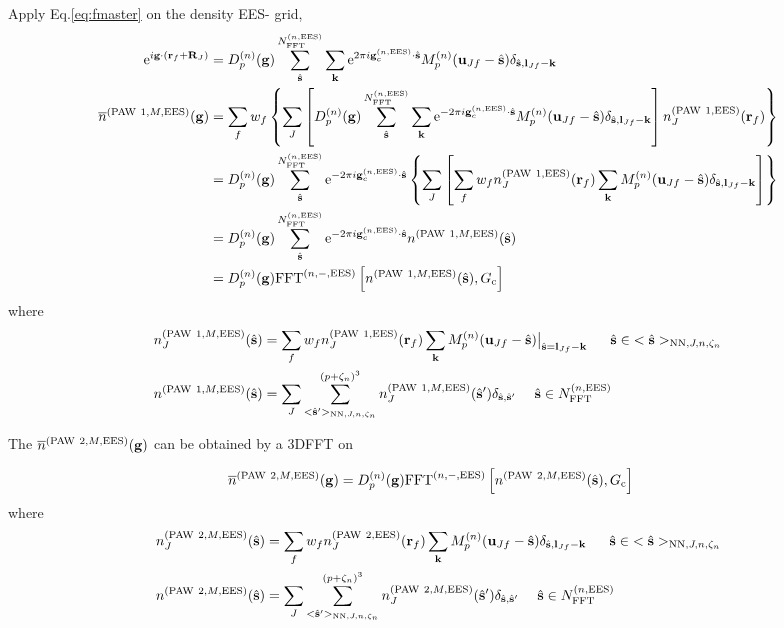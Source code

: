 \documentclass[paper=a4, fontsize=11pt]{article} %
\numberwithin{equation}{section} %
\numberwithin{figure}{section} %
\numberwithin{table}{section} %
\newcommand{\ol}{\overline}
\newcommand{\bu}{{\bf{u}}}
\newcommand{\bl}{{\bf{l}}}
\newcommand{\bk}{{\bf{k}}}
\newcommand{\bs}{{\bf{s}}}
\newcommand{\bg}{{\bf{g}}}
\newcommand{\br}{{\bf{r}}}
\newcommand{\bR}{{\bf{R}}}
\newcommand{\hs}{{\hat{\bf{s}}}}
\newcommand{\rEES}{{\mathrm{EES}}}
\newcommand{\rNN}{{\mathrm{NN}}}
\newcommand{\re}{{\mathrm{e}}}
\newcommand{\rP}{{\mathrm{PAW}}}
\newcommand{\gcnEES}{{\bg_c^{(n,\rEES)}}}
\newcommand{\NFFTnEES}{{N^{(n,\rEES)}_{\mathrm{FFT}}}}
\newcommand{\Gc}{{G_{\mathrm{c}}}}
\newcommand{\Dng}{{D^{(n)}_p(\bg)}}
\newcommand{\FFTniEES}{{\mathrm{FFT}^{(n,-,\rEES)}}}
\newcommand{\pzn}{{(p+\zeta_n)^3}}
\newcommand{\hsJn}{{<\hs>_{\rNN,J,n,\zeta_n}}}
\newcommand{\hsinJn}{{\ \ \ \ \ \hs  \in  \hsJn}}
\newcommand{\hspJn}{{<\hs'>_{\rNN,J,n,\zeta_n}}}
\newcommand{\hsinnEES}{{\ \ \ \ \hs \in \NFFTnEES}}
\begin{document}
Apply Eq.\eqref{eq:fmaster} on the density EES- grid,
\begin{equation} \label{eq:n1gEES}
\begin{split}
\re^{i\bg\cdot(\br_f+\bR_J)}
  & = D_p^{(n)}(\bg)\sum_{\hat \bs}^{\NFFTnEES} \sum_{\bk} \re^{2\pi i\gcnEES \cdot \hat\bs} M_p^{(n)}(\bu_{Jf}-\hat \bs)\delta_{\hat \bs,\bl_{Jf}-\bk} \\
 \ol n^{(\rP\ 1,M,\rEES)}(\bg)
 &=  \sum_f w_f \left\{\sum_J \left[\Dng\sum_{\hat \bs}^{\NFFTnEES} \sum_{\bk} \re^{-2\pi i\gcnEES \cdot \hat\bs} M_p^{(n)}(\bu_{Jf}-\hat \bs)\delta_{\hat \bs,\bl_{Jf}-\bk}\right] n_J^{(\rP\ 1,\rEES)}(\br_f) \right\} \\
 &= D_p^{(n)}(\bg)\sum_{\hat \bs}^{\NFFTnEES} \re^{-2\pi i\gcnEES \cdot \hat\bs}\left\{\sum_J \left[ \sum_f w_f n_J^{(\rP\ 1,\rEES)}(\br_f) \sum_{\bk}  M_p^{(n)}(\bu_{Jf}-\hat \bs)\delta_{\hat \bs,\bl_{Jf}-\bk}\right] \right\}\\
 &= D_p^{(n)}(\bg)\sum_{\hat \bs}^{\NFFTnEES} \re^{-2\pi i\gcnEES \cdot \hat\bs} n^{(\rP\ 1,M,\rEES)}(\hat \bs)\\
 &= \Dng \FFTniEES \left[ n^{(\rP\ 1,M,\rEES)}(\hat \bs), \Gc \right]\\
\end{split}
\end{equation}
where
\begin{equation}
\begin{split}
n_J^{(\rP\ 1,M,\rEES)}(\hs) &=\sum_f w_f n_J^{(\rP\ 1,\rEES)}(\br_f) \sum_{\bk}  M_p^{(n)}(\bu_{Jf}-\hat \bs)\big|_{\hs=\bl_{Jf}-\bk} \hsinJn\\
n^{(\rP\ 1,M,\rEES)}(\hat \bs) &= \sum_J \sum_{\hspJn}^{\pzn} n_J^{(\rP\ 1,M,\rEES)}(\hs') \delta_{\hs,\hs'} \hsinnEES\\
\end{split}
\end{equation}

The  $\ol n^{(\rP\ 2,M,\rEES)}(\bg)$ can be obtained by a 3DFFT on 

\begin{equation} \label{eq:n2gEES}
\begin{split}
 \ol n^{(\rP\ 2,M,\rEES)}(\bg)
 &= \Dng \FFTniEES \left[ n^{(\rP\ 2,M,\rEES)}(\hat \bs), \Gc \right]
\end{split}
\end{equation}
where
\begin{equation}
\begin{split}
n_J^{(\rP\ 2,M,\rEES)}(\hat \bs) &=\sum_f w_f n_J^{(\rP\ 2,\rEES)}(\br_f) \sum_{\bk}  M_p^{(n)}(\bu_{Jf}-\hat \bs)\delta_{\hat \bs,\bl_{Jf}-\bk} \hsinJn\\
n^{(\rP\ 2,M,\rEES)}(\hat \bs) &= \sum_J \sum_{\hspJn}^{\pzn} n_J^{(\rP\ 2,M,\rEES)}(\hs') \delta_{\hs,\hs'} \hsinnEES\\
\end{split}
\end{equation}
\end{document}
